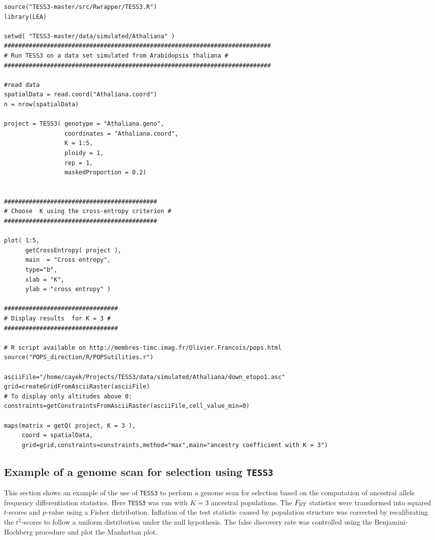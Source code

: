 \documentclass[10pt,a4paper]{article}
\begin{document}
\begin{Verbatim}[frame=single]
source("TESS3-master/src/Rwrapper/TESS3.R")
library(LEA)

setwd( "TESS3-master/data/simulated/Athaliana" )
###########################################################################
# Run TESS3 on a data set simulated from Arabidopsis thaliana #
###########################################################################

#read data
spatialData = read.coord("Athaliana.coord")
n = nrow(spatialData)

project = TESS3( genotype = "Athaliana.geno", 
                 coordinates = "Athaliana.coord", 
                 K = 1:5, 
                 ploidy = 1, 
                 rep = 1, 
                 maskedProportion = 0.2)


###########################################
# Choose  K using the cross-entropy criterion #
###########################################

plot( 1:5, 
      getCrossEntropy( project ), 
      main  = "Cross entropy",
      type="b", 
      xlab = "K", 
      ylab = "cross entropy" )

################################
# Display results  for K = 3 #
################################

# R script available on http://membres-timc.imag.fr/Olivier.Francois/pops.html
source("POPS_direction/R/POPSutilities.r")

asciiFile="/home/cayek/Projects/TESS3/data/simulated/Athaliana/down_etopo1.asc"
grid=createGridFromAsciiRaster(asciiFile)
# To display only altitudes above 0:
constraints=getConstraintsFromAsciiRaster(asciiFile,cell_value_min=0)

maps(matrix = getQ( project, K = 3 ),
     coord = spatialData,
     grid=grid,constraints=constraints,method="max",main="ancestry coefficient with K = 3")

\end{Verbatim}



\subsection{Example of a genome scan for selection using {\tt TESS3}}
This section shows an example of the use of {\tt TESS3} to perform a genome scan for selection based on the computation of ancestral allele frequency differentiation statistics. Here {\tt TESS3} was run with $K = 3$ ancestral populations. The $F_{\rm ST}$ statistics were transformed into squared $t$-scores and $p$-value using a Fisher distribution. Inflation of the test statistic caused by population structure was corrected by recalibrating the $t^2$-scores to follow a uniform distribution under the null hypothesis. The false discovery rate was controlled using the Benjamini-Hochberg procedure and plot the Manhattan plot.
\end{document}
